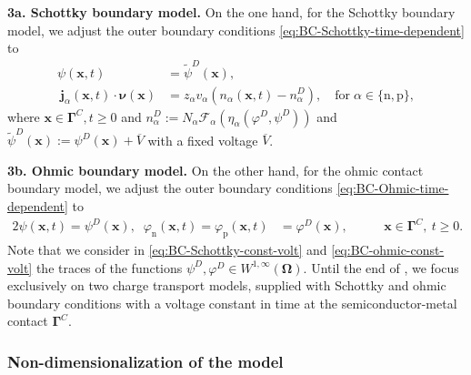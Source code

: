 \documentclass[10pt,a4paper, final]{article}
\def\electrons{\text{n}}
\def\holes{\text{p}}
\theoremstyle{definition}								%
\numberwithin{equation}{section}
\numberwithin{figure}{section}
\numberwithin{theorem}{section}
\begin{document}
\noindent
\textbf{3a. Schottky boundary model.}
On the one hand, for the Schottky boundary model, we adjust the outer boundary conditions \eqref{eq:BC-Schottky-time-dependent} to
\begin{subequations}\label{eq:BC-Schottky-const-volt}
    \begin{alignat}{2}
        \psi(\mathbf{x}, t) &= \tilde{\psi}^D(\mathbf{x}), \label{eq:BC-Schottky-const-volt-psi}\\
        ~
        \mathbf{j}_\alpha (\mathbf{x}, t) \cdot \boldsymbol{\nu} (\mathbf{x}) &= z_\alpha v_\alpha \left( n_\alpha(\mathbf{x}, t) - n_\alpha^D \right), \quad \text{for} \; \alpha \in \{\electrons, \holes \}, \label{eq:BC-Schottky-const-volt-n-p}
    \end{alignat}
\end{subequations}
where $\mathbf{x} \in \mathbf{\Gamma}^C,  t \geq 0$ and $n_\alpha^D := N_\alpha \mathcal{F}_\alpha \left( \eta_\alpha(\varphi^D, \psi^D) \right)$ and $ \tilde{\psi}^D(\mathbf{x}) := \psi^D(\mathbf{x}) + \overline{V}$ with a fixed voltage $\overline{V}$.

\noindent
\textbf{3b. Ohmic boundary model.}
On the other hand, for the ohmic contact boundary model, we adjust the outer boundary conditions \eqref{eq:BC-Ohmic-time-dependent} to
\begin{alignat}{2}\label{eq:BC-ohmic-const-volt}
    \psi(\mathbf{x}, t) = \psi^D(\mathbf{x}), \;\; \varphi_\electrons(\mathbf{x}, t)  = \varphi_\holes(\mathbf{x}, t) &= \varphi^D(\mathbf{x}), \quad
    ~
    &&\mathbf{x} \in \mathbf{\Gamma}^C,  \ t \geq 0.
\end{alignat}
Note that we consider in \eqref{eq:BC-Schottky-const-volt} and \eqref{eq:BC-ohmic-const-volt} the traces of the functions $\psi^D, \varphi^D \in W^{1, \infty}(\boldsymbol{\Omega})$.
Until the end of , we focus exclusively on two charge transport models, supplied with Schottky and ohmic boundary conditions with a voltage constant in time at the semiconductor-metal contact $\mathbf{\Gamma}^C$.

\subsubsection{Non-dimensionalization of the model} \label{sec:nondimens-model}
\end{document}
